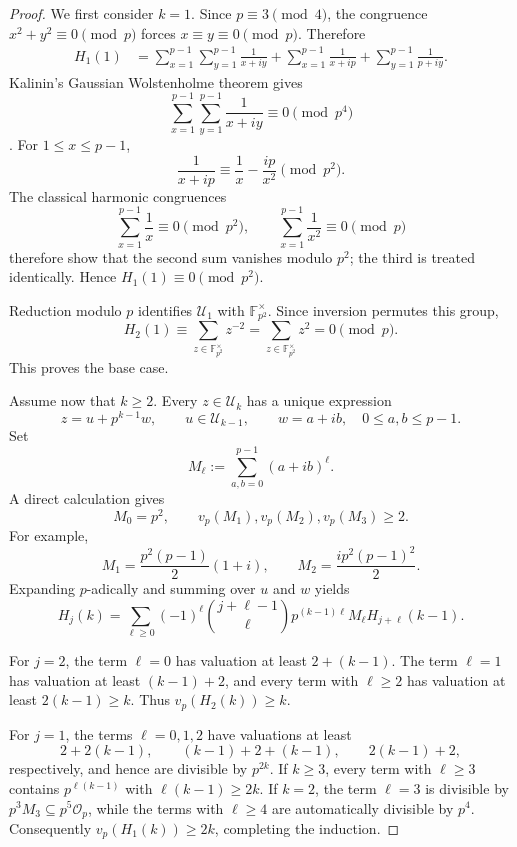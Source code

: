 \documentclass[a4paper,american,11pt]{amsart}
\numberwithin{equation}{section}
\theoremstyle{definition}
\newcommand{\F}{\mathbb F}
\newcommand{\Op}{\mathcal O_p}
\newcommand{\vp}{v_p}
\begin{document}
\begin{proof}
We first consider $k=1$. Since $p\equiv 3\pmod 4$, the congruence $x^2+y^2\equiv 0\pmod p$ forces $x\equiv y\equiv 0\pmod p$. Therefore
\begin{align*}
H_1(1)
&=
\sum_{x=1}^{p-1}\sum_{y=1}^{p-1}\frac{1}{x+iy}
+
\sum_{x=1}^{p-1}\frac{1}{x+ip}
+
\sum_{y=1}^{p-1}\frac{1}{p+iy}.
\end{align*}
Kalinin's Gaussian Wolstenholme theorem gives
\[
\sum_{x=1}^{p-1}\sum_{y=1}^{p-1}\frac{1}{x+iy}
\equiv 0\pmod{p^4}
\]
\cite[Theorem~1]{Kalinin2025}. For $1\leq x\leq p-1$,
\[
\frac{1}{x+ip}
\equiv
\frac1x-\frac{ip}{x^2}
\pmod{p^2}.
\]
The classical harmonic congruences
\[
\sum_{x=1}^{p-1}\frac1x\equiv0\pmod{p^2},
\qquad
\sum_{x=1}^{p-1}\frac1{x^2}\equiv0\pmod p
\]
therefore show that the second sum vanishes modulo $p^2$; the third is treated identically. Hence $H_1(1)\equiv0\pmod{p^2}$.

Reduction modulo $p$ identifies $\mathcal U_1$ with $\F_{p^2}^{\times}$. Since inversion permutes this group,
\[
H_2(1)
\equiv
\sum_{z\in\F_{p^2}^{\times}}z^{-2}
=
\sum_{z\in\F_{p^2}^{\times}}z^2
=0
\pmod p.
\]
This proves the base case.

Assume now that $k\geq 2$. Every $z\in\mathcal U_k$ has a unique expression
\[
z=u+p^{k-1}w,
\qquad
u\in\mathcal U_{k-1},
\qquad
w=a+ib,
\quad 0\leq a,b\leq p-1.
\]
Set
\[
M_\ell:=\sum_{a,b=0}^{p-1}(a+ib)^\ell.
\]
A direct calculation gives
\[
M_0=p^2,
\qquad
\vp(M_1),\vp(M_2),\vp(M_3)\geq 2.
\]
For example,
\[
M_1=\frac{p^2(p-1)}2(1+i),
\qquad
M_2=\frac{i p^2(p-1)^2}{2}.
\]
Expanding $p$-adically and summing over $u$ and $w$ yields
\begin{equation}\label{eq:H-recursion}
H_j(k)
=
\sum_{\ell\geq 0}
(-1)^\ell
\binom{j+\ell-1}{\ell}
 p^{(k-1)\ell}M_\ell H_{j+\ell}(k-1).
\end{equation}

For $j=2$, the term $\ell=0$ has valuation at least $2+(k-1)$. The term $\ell=1$ has valuation at least $(k-1)+2$, and every term with $\ell\geq2$ has valuation at least $2(k-1)\geq k$. Thus $\vp(H_2(k))\geq k$.

For $j=1$, the terms $\ell=0,1,2$ have valuations at least
\[
2+2(k-1),
\qquad
(k-1)+2+(k-1),
\qquad
2(k-1)+2,
\]
respectively, and hence are divisible by $p^{2k}$. If $k\geq3$, every term with $\ell\geq3$ contains $p^{\ell(k-1)}$ with $\ell(k-1)\geq2k$. If $k=2$, the term $\ell=3$ is divisible by $p^{3}M_3\subseteq p^5\Op$, while the terms with $\ell\geq4$ are automatically divisible by $p^4$. Consequently $\vp(H_1(k))\geq2k$, completing the induction.
\end{proof}
\end{document}
